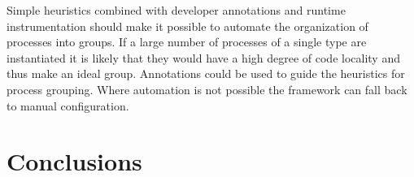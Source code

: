 \documentclass[conference]{IEEEtran}
\begin{document}
Simple heuristics combined with developer annotations and runtime instrumentation should make it possible to automate the organization of processes into groups. If a large number of processes of a single type are instantiated it is likely that they would have a high degree of code locality and thus make an ideal group. Annotations could be used to guide the heuristics for process grouping. Where automation is not possible the framework can fall back to manual configuration.

\section{Conclusions}





\end{document}
